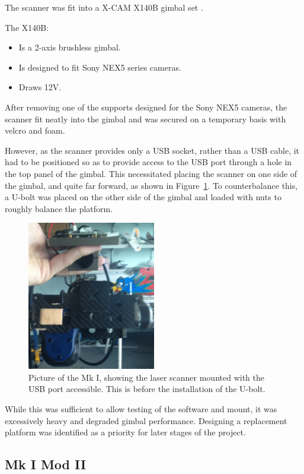 \documentclass[12pt,oneside,a4paper]{book}
\begin{document}
The scanner was fit into a X-CAM X140B gimbal set \cite{gimbal}. 

The X140B:
\begin{itemize}
\item Is a 2-axis brushless gimbal.
\item Is designed to fit Sony NEX5 series cameras.
\item Draws 12V.
\end{itemize}

After removing one of the supports designed for the Sony NEX5 cameras,
the scanner fit neatly into the gimbal and was secured on a temporary
basis with velcro and foam.

However, as the scanner provides only a USB socket, rather than a USB
cable, it had to be positioned so as to provide access to the USB port
through a hole in the top panel of the gimbal. This necessitated
placing the scanner on one side of the gimbal, and quite far forward,
as shown in Figure~\ref{fig:mk1-mount}. To counterbalance this, a
U-bolt was placed on the other side of the gimbal and loaded with nuts
to roughly balance the platform.

\begin{figure}[h!]
  \centering
  \includegraphics[width=0.5\textwidth]{figs/mk1-mount}
  \caption{Picture of the Mk I, showing the laser scanner mounted with the USB port accessible. This is before the installation of the U-bolt.}
  \label{fig:mk1-mount}
\end{figure}

While this was sufficient to allow testing of the software and mount,
it was excessively heavy and degraded gimbal performance. Designing a
replacement platform was identified as a priority for later stages of the project.

\subsection{Mk I Mod II}
\label{sec:mk-ib}
\end{document}
